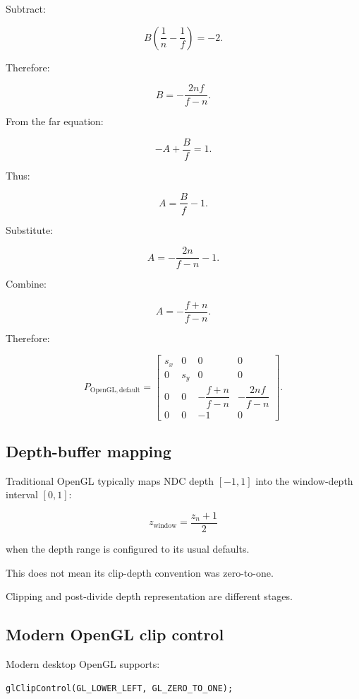 Subtract:

\[
 B\left(\frac1n-\frac1f\right)=-2.
\]

Therefore:

\[
 B=-\frac{2nf}{f-n}.
\]

From the far equation:

\[
 -A+\frac Bf=1.
\]

Thus:

\[
 A=\frac Bf-1.
\]

Substitute:

\[
 A=-\frac{2n}{f-n}-1.
\]

Combine:

\[
 \boxed{ A=-\frac{f+n}{f-n} }.
\]

Therefore:

\[
 \boxed{ P_{\mathrm{OpenGL,default}}= \begin{bmatrix} s_x&0&0&0\\ 0&s_y&0&0\\ 0&0&-\dfrac{f+n}{f-n}&-\dfrac{2nf}{f-n}\\ 0&0&-1&0 \end{bmatrix} }.
\]

\subsection{Depth-buffer mapping}\label{02-foundations-ii-ch033-depth-buffer-mapping}

\hypertarget{02-foundations-ii-ch033-depth-buffer-mapping}{}

Traditional OpenGL typically maps NDC depth \([-1,1]\) into the window-depth interval \([0,1]\):

\[
 \boxed{ z_{\mathrm{window}}=\frac{z_n+1}{2} }
\]

when the depth range is configured to its usual defaults.

This does not mean its clip-depth convention was zero-to-one.

Clipping and post-divide depth representation are different stages.

\subsection{Modern OpenGL clip control}\label{02-foundations-ii-ch033-modern-opengl-clip-control}

\hypertarget{02-foundations-ii-ch033-modern-opengl-clip-control}{}

Modern desktop OpenGL supports:

\begin{verbatim}
glClipControl(GL_LOWER_LEFT, GL_ZERO_TO_ONE);
\end{verbatim}

